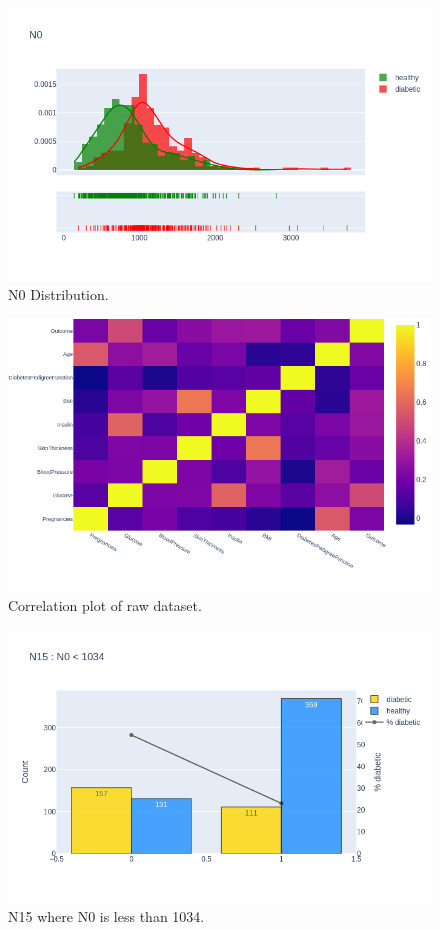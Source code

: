 \documentclass[12pt]{article}
\begin{document}
\begin{figure}[ht]
\centering
\includegraphics[width=1\textwidth]{newplot(39).png}
\caption{N0 Distribution.}
\end{figure}

\begin{figure}[ht]
\centering
\includegraphics[width=1\textwidth]{newplot(3).png}
\caption{Correlation plot of raw dataset.}
\end{figure}

\begin{figure}[ht]
\centering
\includegraphics[width=1\textwidth]{newplot(40).png}
\caption{N15 where N0 is less than 1034.}
\end{figure}
\end{document}
